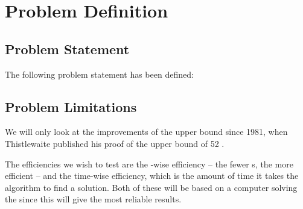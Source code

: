 \chapter{Problem Definition}
\emptyTop{}

\section{Problem Statement}
The following problem statement has been defined:



\pagebreak
\section{Problem Limitations}
\label{sec:problemLimitations}
We will only look at the improvements of the upper bound since 1981, when Thistlewaite published his proof of the upper bound of 52 \cite{knowledgerush2}.%

The efficiencies we wish to test are the \twist{}-wise efficiency -- the fewer \twist{}s, the more efficient -- and the time-wise efficiency, which is the amount of time it takes the algorithm to find a solution.
Both of these will be based on a computer solving the \rubik{} since this will give the most reliable results.



